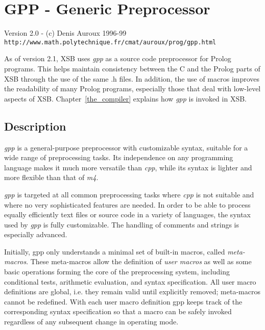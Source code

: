 \chapter{GPP - Generic Preprocessor}
\label{gpp-man}

\begin{center}
  \large
Version 2.0 - (c) Denis Auroux 1996-99
\\
\verb|http://www.math.polytechnique.fr/cmat/auroux/prog/gpp.html|
\end{center}


As of version 2.1, XSB uses \emph{gpp} as a source code preprocessor for
Prolog programs. This helps maintain consistency between the C and the
Prolog parts of XSB through the use of the same .h files. In addition, the
use of macros improves the readability of many Prolog programs, especially
those that deal with low-level aspects of XSB.  Chapter~\ref{the_compiler}
explains how \emph{gpp} is invoked in XSB.

\section{Description}


{\it gpp} is a general-purpose preprocessor with customizable syntax,
suitable for a wide range of preprocessing tasks. Its independence on 
any programming language makes it much more versatile than {\it cpp},
while its syntax is lighter and more flexible than that of {\it m4}.


{\it gpp} is targeted at all common preprocessing tasks where {\it cpp} is not
suitable and where no very sophisticated features are needed. In order to be
able to process equally efficiently text files or source code in a variety
of languages, the syntax used by {\it gpp} is fully customizable. The
handling of comments and strings is especially advanced.


Initially, gpp only understands a minimal set of built-in macros, called
{\it meta-macros}. These meta-macros allow the definition of {\it user macros}
as well as some basic operations forming the core of the preprocessing
system, including conditional tests, arithmetic evaluation, and syntax
specification. All user macro definitions are global, i.e. they remain
valid until explicitly removed; meta-macros cannot be redefined. With
each user macro definition gpp keeps track of the corresponding syntax 
specification so that a macro can be safely invoked regardless of any
subsequent change in operating mode.



